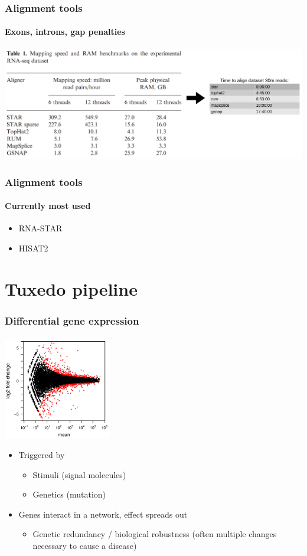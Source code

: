 \documentclass{beamer}			  %
\begin{document}
\begin{frame}
\frametitle{Alignment tools}
\framesubtitle{Exons, introns, gap penalties}
	\begin{center}
		\includegraphics[width=\textwidth]{figures/dge_06p.png}\\\cite{star}
	\end{center}
\end{frame}


\begin{frame}
\frametitle{Alignment tools}
\framesubtitle{Currently most used}
	\begin{itemize}
		\item RNA-STAR\cite{star}
		\item HISAT2\cite{hisat}
	\end{itemize}
\end{frame}

\section{Tuxedo pipeline}

\begin{frame}
	\frametitle{Differential gene expression}
	\framesubtitle{}
	\includegraphics[width=0.35\textwidth]{figures/diff_expr.jpg}\\
	\begin{itemize}
		\item Triggered by
		\begin{itemize}
			\item Stimuli (signal molecules)
			\item Genetics (mutation)
		\end{itemize}
		\item Genes interact in a network, effect spreads out
		\begin{itemize}
			\item Genetic redundancy / biological robustness (often multiple changes necessary to cause a disease)
		\end{itemize}
	\end{itemize}
\end{frame}
  
\end{document}

